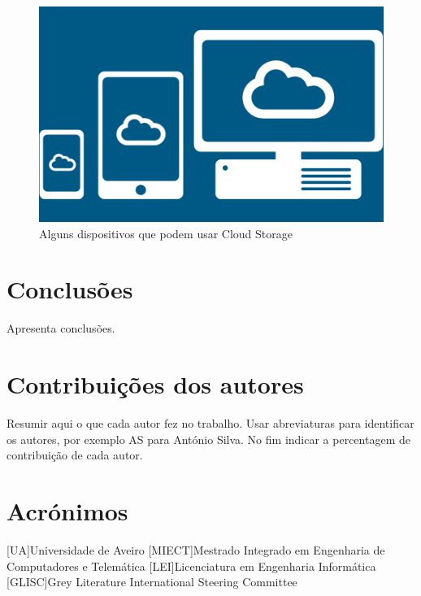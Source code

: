 \documentclass{report}
\begin{document}
\vspace{15mm}
 
 	\begin{figure} [h]
		\centering
		\includegraphics[scale=0.5]{cloud-storage2.png}
		\caption{Alguns dispositivos que podem usar Cloud Storage}
	\end{figure}

	
		
	

\chapter{Conclusões}
\label{chap.conclusao}
Apresenta conclusões.

\chapter*{Contribuições dos autores}
Resumir aqui o que cada autor fez no trabalho.
Usar abreviaturas para identificar os autores,
por exemplo AS para António Silva.
No fim indicar a percentagem de contribuição de cada autor.

\chapter*{Acrónimos}
\begin{acronym}
[UA]{Universidade de Aveiro}
[MIECT]{Mestrado Integrado em Engenharia de Computadores e Telemática}
[LEI]{Licenciatura em Engenharia Informática}
[GLISC]{Grey Literature International Steering Committee}
\end{acronym}


\printbibliography
\end{document}
